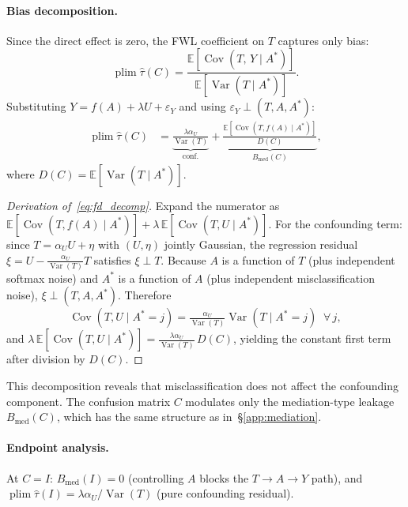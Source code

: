 \paragraph{Bias decomposition.}
Since the direct effect is zero, the FWL coefficient on $T$ captures only bias:
\[
  \operatorname{plim}\hat\tau(C) = \frac{\mathbb{E}[\operatorname{Cov}(T,\,Y\mid A^*)]}{\mathbb{E}[\operatorname{Var}(T\mid A^*)]}.
\]
Substituting $Y=f(A)+\lambda U+\varepsilon_Y$ and using $\varepsilon_Y\perp(T,A,A^*)$:
\begin{align}
  \operatorname{plim}\hat\tau(C)
  &= \underbrace{\frac{\lambda\alpha_U}{\operatorname{Var}(T)}}_{\text{conf.}}
  + \underbrace{\frac{\mathbb{E}[\operatorname{Cov}(T,\!f(A)\mid A^*)]}{D(C)}}_{B_{\mathrm{med}}(C)}\!,
  \label{eq:fd_decomp}
\end{align}
where $D(C)=\mathbb{E}[\operatorname{Var}(T\mid A^*)]$.

\begin{proof}[Derivation of~\eqref{eq:fd_decomp}]
Expand the numerator as
$\mathbb{E}[\operatorname{Cov}(T,f(A)\mid A^*)] + \lambda\,\mathbb{E}[\operatorname{Cov}(T,U\mid A^*)]$.
For the confounding term: since $T=\alpha_U U+\eta$ with $(U,\eta)$ jointly Gaussian, the regression residual $\xi=U-\frac{\alpha_U}{\operatorname{Var}(T)}T$ satisfies $\xi\perp T$.
Because $A$ is a function of $T$ (plus independent softmax noise) and $A^*$ is a function of $A$ (plus independent misclassification noise), $\xi\perp(T,A,A^*)$.
Therefore
\[
  \operatorname{Cov}(T,U\mid A^*\!{=}j)
  = \tfrac{\alpha_U}{\operatorname{Var}(T)}\operatorname{Var}(T\mid A^*\!{=}j)
  \;\;\forall\,j,
\]
and $\lambda\,\mathbb{E}[\operatorname{Cov}(T,U\mid A^*)]=\frac{\lambda\alpha_U}{\operatorname{Var}(T)}\,D(C)$, yielding the constant first term after division by $D(C)$.
\end{proof}

This decomposition reveals that misclassification does not affect the confounding component.
The confusion matrix $C$ modulates only the mediation-type leakage $B_{\mathrm{med}}(C)$, which has the same structure as in~§\ref{app:mediation}.

\paragraph{Endpoint analysis.}
At $C=I$: $B_{\mathrm{med}}(I)=0$ (controlling $A$ blocks the $T\to A\to Y$ path), and $\operatorname{plim}\hat\tau(I)=\lambda\alpha_U/\operatorname{Var}(T)$ (pure confounding residual).


